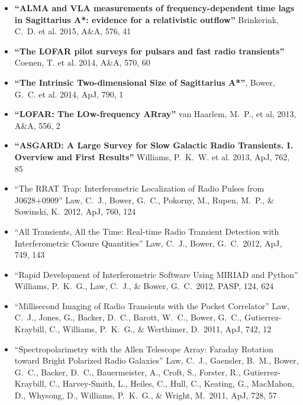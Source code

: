 \documentclass[11pt]{article}
\begin{document}
\begin{itemize}
\item {\bf ``ALMA and VLA measurements of frequency-dependent time lags in Sagittarius A*: evidence for a relativistic outflow''} Brinkerink, C.~D. et al. 2015, A\&A, 576, 41

 \item {\bf ``The LOFAR pilot surveys for pulsars and fast radio transients''} Coenen, T. et al. 2014, A\&A, 570, 60

 \item {\bf ``The Intrinsic Two-dimensional Size of Sagittarius A*''}, Bower, G.~C. et al. 2014, ApJ, 790, 1
   
 \item {\bf ``LOFAR: The LOw-frequency ARray''} van Haarlem, M.~P., et al, 2013, A\&A, 556, 2

 \item {\bf ``ASGARD: A Large Survey for Slow Galactic Radio Transients. I. Overview and First Results''} Williams, P.~K.~W. et al. 2013, ApJ, 762, 85
   
 \item ``The RRAT Trap: Interferometric Localization of Radio Pulses from J0628+0909'' Law, C.~J., Bower, G.~C., Pokorny, M., Rupen, M.~P., \& Sowinski, K.\ 2012, ApJ, 760, 124

 \item ``All Transients, All the Time: Real-time Radio Transient Detection with Interferometric Closure Quantities'' Law, C.~J., Bower, G.~C.\ 2012, ApJ, 749, 143

 \item ``Rapid Development of Interferometric Software Using MIRIAD and Python'' Williams, P.~K.~G., Law, C.~J., \& Bower, G.~C.\ 2012, PASP, 124, 624 

 \item ``Millisecond Imaging of Radio Transients with the Pocket Correlator'' Law, C.~J., Jones, G., Backer, D.~C., Barott, W.~C., Bower, G.~C., Gutierrez-Kraybill, C., Williams, P.~K.~G., \& Werthimer, D.\ 2011, ApJ, 742, 12

 \item ``Spectropolarimetry with the Allen Telescope Array:  Faraday Rotation toward Bright Polarized Radio Galaxies'' Law, C.~J., Gaensler, B.~M., Bower, G.~C., Backer, D.~C., Bauermeister, A., Croft, S., Forster, R., Gutierrez-Kraybill, C., Harvey-Smith, L., Heiles, C., Hull, C., Keating, G., MacMahon, D., Whysong, D., Williams, P.~K.~G., \& Wright, M.\ 2011, ApJ, 728, 57


\end{itemize}
\end{document}
